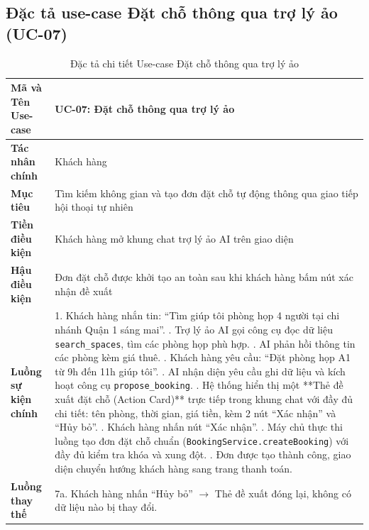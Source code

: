 \subsection{Đặc tả use-case Đặt chỗ thông qua trợ lý ảo (UC-07)}
\begin{table}[H]
\centering
\small
\renewcommand{\arraystretch}{1.2}
\begin{tabular}{|p{3.6cm}|p{10.4cm}|}
\hline
\textbf{Mã và Tên Use-case} & \textbf{UC-07: Đặt chỗ thông qua trợ lý ảo} \\ \hline
\textbf{Tác nhân chính} & Khách hàng \\ \hline
\textbf{Mục tiêu} & Tìm kiếm không gian và tạo đơn đặt chỗ tự động thông qua giao tiếp hội thoại tự nhiên \\ \hline
\textbf{Tiền điều kiện} & Khách hàng mở khung chat trợ lý ảo AI trên giao diện \\ \hline
\textbf{Hậu điều kiện} & Đơn đặt chỗ được khởi tạo an toàn sau khi khách hàng bấm nút xác nhận đề xuất \\ \hline
\textbf{Luồng sự kiện chính} & 
1. Khách hàng nhắn tin: ``Tìm giúp tôi phòng họp 4 người tại chi nhánh Quận 1 sáng mai''. \newline
2. Trợ lý ảo AI gọi công cụ đọc dữ liệu \texttt{search\_spaces}, tìm các phòng họp phù hợp. \newline
3. AI phản hồi thông tin các phòng kèm giá thuê. \newline
4. Khách hàng yêu cầu: ``Đặt phòng họp A1 từ 9h đến 11h giúp tôi''. \newline
5. AI nhận diện yêu cầu ghi dữ liệu và kích hoạt công cụ \texttt{propose\_booking}. \newline
6. Hệ thống hiển thị một **Thẻ đề xuất đặt chỗ (Action Card)** trực tiếp trong khung chat với đầy đủ chi tiết: tên phòng, thời gian, giá tiền, kèm 2 nút ``Xác nhận'' và ``Hủy bỏ''. \newline
7. Khách hàng nhấn nút ``Xác nhận''. \newline
8. Máy chủ thực thi luồng tạo đơn đặt chỗ chuẩn (\texttt{BookingService.createBooking}) với đầy đủ kiểm tra khóa và xung đột. \newline
9. Đơn được tạo thành công, giao diện chuyển hướng khách hàng sang trang thanh toán. \\ \hline
\textbf{Luồng thay thế} & 
7a. Khách hàng nhấn ``Hủy bỏ'' $\rightarrow$ Thẻ đề xuất đóng lại, không có dữ liệu nào bị thay đổi. \\ \hline
\end{tabular}
\caption{Đặc tả chi tiết Use-case Đặt chỗ thông qua trợ lý ảo}
\label{tab:uc_spec_07}
\end{table}

